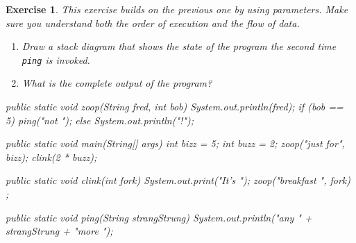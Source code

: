 \documentclass[12pt]{book}
\theoremstyle{exercise}
\newtheorem{exercise}{Exercise}[chapter]
\newcommand{\java}[1]{\verb"#1"}
\newcommand{\java}[1]{\lstinline{#1}} %
\begin{document}
\begin{exercise}
This exercise builds on the previous one by using parameters.
Make sure you understand both the order of execution and the flow of data.

\begin{enumerate}

\item Draw a stack diagram that shows the state of the program the {\it second} time \java{ping} is invoked.

\item What is the complete output of the program?

\end{enumerate}

\begin{code}
    public static void zoop(String fred, int bob) {
        System.out.println(fred);
        if (bob == 5) {
            ping("not ");
        } else {
            System.out.println("!");
        }
    }

    public static void main(String[] args) {
        int bizz = 5;
        int buzz = 2;
        zoop("just for", bizz);
        clink(2 * buzz);
    }

    public static void clink(int fork) {
        System.out.print("It's ");
        zoop("breakfast ", fork) ;
    }

    public static void ping(String strangStrung) {
        System.out.println("any " + strangStrung + "more ");
    }
\end{code}
\end{exercise}







\end{document}
